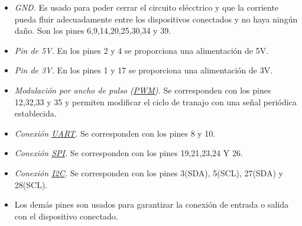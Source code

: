 \begin{itemize}
 \item \textit{GND.} Es usado para poder cerrar el circuito elécctrico y que la corriente pueda fluir adecuadamente entre los dispositivos conectados y no haya ningún daño. Son los pines 6,9,14,20,25,30,34 y 39.
 \item \textit{Pin de 5V.} En los pines 2 y 4 se proporciona una alimentación de 5V.
 \item \textit{Pin de 3V.} En los pines 1 y 17 se proporciona una alimentación de 3V.
 \item \textit{Modulación por ancho de pulso (\hyperlink{PWM}{PWM}).} Se corresponden con los pines 12,32,33 y 35 y permiten modificar el ciclo de tranajo con una señal periódica establecida.
 \item \textit{Conexión \hyperlink{UART}{UART}.} Se corresponden con los pines 8 y 10.
 \item \textit{Conexión \hyperlink{SPI}{SPI}.} Se corresponden con los pines 19,21,23,24 Y 26.
 \item \textit{Conexión \hyperlink{I2C}{I2C}.} Se corresponden con los pines 3(SDA), 5(SCL), 27(SDA) y 28(SCL).	
 \item \textit{} Los demás pines son usados para garantizar la conexión de entrada o salida con el dispositivo conectado. 
\end{itemize}\

